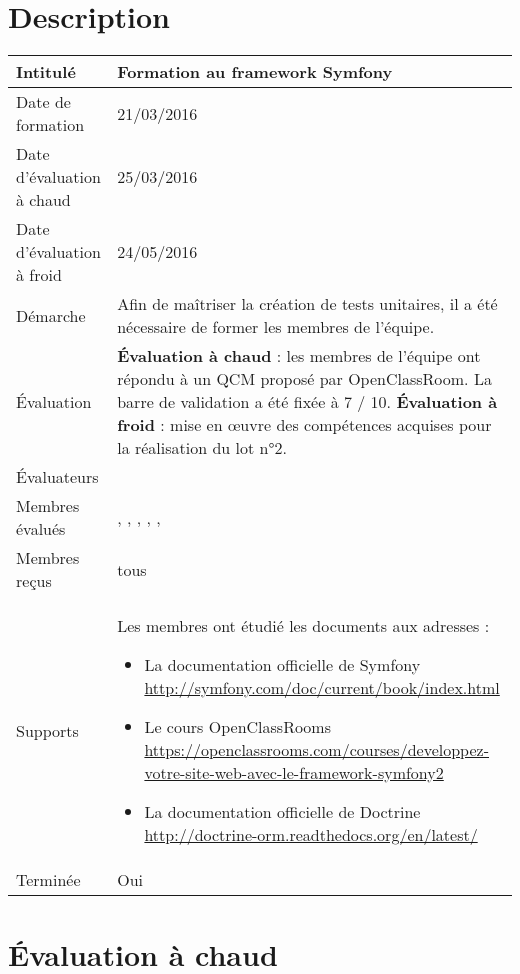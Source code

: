 \documentclass[asi, sansVersion]{picInsa}
\begin{document}
	\section*{Description}
		\begin{longtable}{|p{}|p{}|}
			\hline
			\cellcolor{gris2} Intitulé & Formation au framework Symfony\\\hline
			\cellcolor{gris2} Date de formation & 21/03/2016\\\hline
			\cellcolor{gris2} Date d'évaluation à chaud & 25/03/2016 \\\hline
			\cellcolor{gris2} Date d'évaluation à froid & 24/05/2016 \\\hline
			\cellcolor{gris2} Démarche & Afin de maîtriser la création de tests unitaires, il a été nécessaire de former les membres de l'équipe.\\\hline
			\cellcolor{gris2} Évaluation &
				\textbf{Évaluation à chaud} : les membres de l'équipe ont répondu à un QCM proposé par OpenClassRoom. La barre de validation a été fixée à 7 / 10.\newline
				\textbf{Évaluation à froid} : mise en œuvre des compétences acquises pour la réalisation du lot n°2.\\\hline
			\cellcolor{gris2} Évaluateurs & \Florian{}\\\hline
			\cellcolor{gris2} Membres évalués & \Melissa{}, \Michel{}, \Matthieu{}, \Mathieu{}, \Kafui{}, \Julie{}\\\hline
			\cellcolor{gris2} Membres reçus & tous \\\hline
			\cellcolor{gris2} Supports & Les membres ont étudié les documents aux adresses : \begin{itemize}
			\item La documentation officielle de Symfony \url{http://symfony.com/doc/current/book/index.html}
                        \item Le cours OpenClassRooms \url{https://openclassrooms.com/courses/developpez-votre-site-web-avec-le-framework-symfony2}
                        \item La documentation officielle de Doctrine \url{http://doctrine-orm.readthedocs.org/en/latest/}
		\end{itemize}
			 \\\hline
			\cellcolor{gris2} Terminée & Oui \\\hline
		\end{longtable}
		\newpage
	\section*{Évaluation à chaud}
\end{document}
